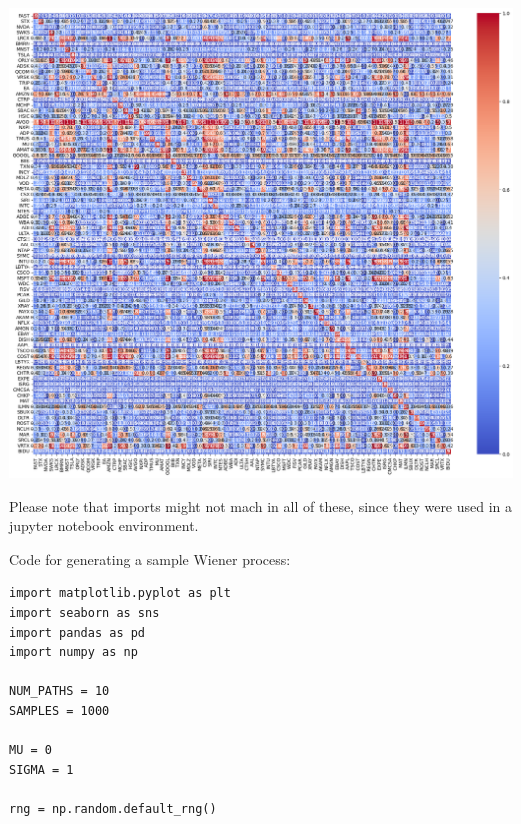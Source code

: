 \documentclass{article}
\begin{document}
\begin{spacing}{2.0}
\begin{center}
    \includegraphics[scale=0.40]{./images/full_cointegration_heatmap.png}
\end{center}



\singlespacing
\lstset{language=Python}

Please note that imports might not mach in all of these, since they were used in a jupyter notebook environment.

Code for generating a sample Wiener process:

\begin{lstlisting}
import matplotlib.pyplot as plt
import seaborn as sns
import pandas as pd
import numpy as np

NUM_PATHS = 10
SAMPLES = 1000

MU = 0
SIGMA = 1

rng = np.random.default_rng()


\end{lstlisting}
\end{spacing}
\end{document}
